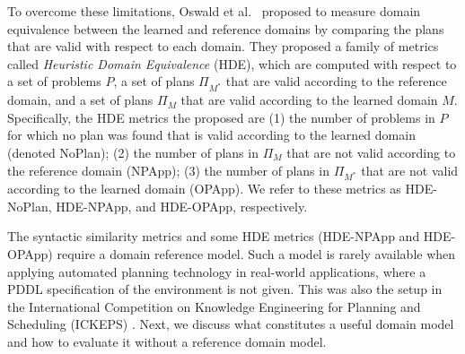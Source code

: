 \documentclass[letterpaper]{article} %
\newcommand{\realm}{{\ensuremath{M^*}}\xspace}
\newif\ifaddcomments
\newcommand{\roni}[1]{\ifaddcomments{\textcolor{red}{[Roni: #1]}}\fi}
\newcommand{\leo}[1]{\ifaddcomments{\textcolor{pink}{[Leonardo: #1]}}\fi}
\begin{document}
To overcome these limitations, Oswald et al.~ proposed to  
measure domain equivalence between the learned and reference domains by comparing the plans that are valid with respect to each domain.  
They proposed a family of metrics called \emph{Heuristic Domain Equivalence} (HDE), which are computed with respect to a set of problems $P$, a set of plans $\Pi_\realm$ that are valid according to the reference domain, and a set of plans $\Pi_M$ that are valid according to the learned domain $M$. Specifically, the HDE metrics the proposed are (1) the number of problems in $P$ for which no plan was found that is valid according to the learned domain (denoted NoPlan); (2) the number of plans in $\Pi_M$ that are not valid according to the reference domain (NPApp); (3) the number of plans in $\Pi_\realm$ that are not valid according to the learned domain (OPApp). We refer to these metrics as HDE-NoPlan, HDE-NPApp, and HDE-OPApp, respectively. 

The syntactic similarity metrics and some HDE metrics (HDE-NPApp and HDE-OPApp) require a domain reference model. 
Such a model is rarely available when applying automated planning technology in real-world applications, 
where a PDDL specification of the environment is not given. 
This was also the setup in the International Competition on Knowledge Engineering for Planning and Scheduling (ICKEPS) \citep{DBLP:journals/aim/ChrpaMVV17}. 
Next, we discuss what constitutes a useful domain model and how to evaluate it without a reference domain model.
\end{document}
